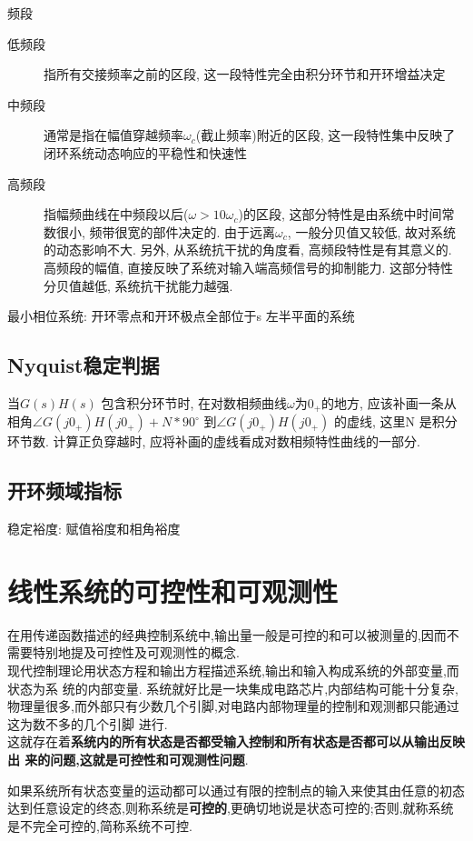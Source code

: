 \documentclass{article}
\begin{document}
频段
\begin{description}
	\item[低频段] 指所有交接频率之前的区段, 这一段特性完全由积分环节和开环增益决定
	\item[中频段] 通常是指在幅值穿越频率$\omega_c$(截止频率)附近的区段, 这一段特性集中反映了闭环系统动态响应的平稳性和快速性
	\item[高频段] 指幅频曲线在中频段以后($\omega > 10\omega_c$)的区段, 这部分特性是由系统中时间常数很小, 频带很宽的部件决定的. 由于远离$\omega_c$, 一般分贝值又较低, 故对系统的动态影响不大. 另外, 从系统抗干扰的角度看, 高频段特性是有其意义的. 高频段的幅值, 直接反映了系统对输入端高频信号的抑制能力. 这部分特性分贝值越低, 系统抗干扰能力越强.
\end{description}

最小相位系统: 开环零点和开环极点全部位于s 左半平面的系统
\subsection{Nyquist稳定判据}
当$G(s)H(s)$ 包含积分环节时, 在对数相频曲线$\omega$为$0_+$的地方, 应该补画一条从相角$\angle G(j0_+)H(j0_+)+N*90^\circ$ 到$\angle G(j0_+)H(j0_+)$
的虚线, 这里N 是积分环节数.\newline
计算正负穿越时, 应将补画的虚线看成对数相频特性曲线的一部分.

\subsection{开环频域指标}
稳定裕度: 赋值裕度和相角裕度

\section{线性系统的可控性和可观测性}
在用传递函数描述的经典控制系统中,输出量一般是可控的和可以被测量的,因而不需要特别地提及可控性及可观测性的概念.\\
现代控制理论用状态方程和输出方程描述系统,输出和输入构成系统的外部变量,而状态为系 统的内部变量.
系统就好比是一块集成电路芯片,内部结构可能十分复杂,物理量很多,而外部只有少数几个引脚,对电路内部物理量的控制和观测都只能通过这为数不多的几个引脚 进行.\\
这就存在着\textbf{系统内的所有状态是否都受输入控制和所有状态是否都可以从输出反映出 来的问题,这就是可控性和可观测性问题}.

如果系统所有状态变量的运动都可以通过有限的控制点的输入来使其由任意的初态达到任意设定的终态,则称系统是\textbf{可控的},更确切地说是状态可控的;否则,就称系统是不完全可控的,简称系统不可控.
\end{document}
